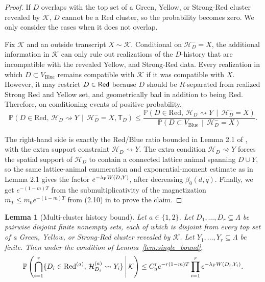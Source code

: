 \documentclass[letterpaper,11pt,reqno]{amsart}
\newtheorem{lemma}[thm]{Lemma}
\theoremstyle{definition}
\newcommand{\Red}{{\sf Red}}
\begin{document}
\begin{proof}
If $D$ overlaps with the top set of a Green, Yellow, or Strong-Red
cluster revealed by \(\mathcal K\), $D$ cannot be a Red cluster, so the probability becomes zero. We only consider the cases when it does not overlap.


Fix \(\mathcal K\) and an outside transcript \(X\sim\mathcal K\). 
Conditional on \(\mathcal H_D^-=X\), the additional information in \(\mathcal K\) can only rule out realizations of the \(D\)-history that are incompatible with the revealed Yellow, and Strong-Red data. 
Every realization in which \(D\subset V_{\mathrm{Blue}}\) remains compatible with \(\mathcal K\) if it was compatible with $X$. 
However, it may restrict $D\in\Red$ because $D$ should be $R$-separated from realized Strong Red and Yellow set, and geometrically bad in addition to being Red. 
Therefore, on conditioning events of positive probability,
\[
\mathbb P\left(
D\in\mathrm{Red},\,\mathcal H_D\rightsquigarrow Y
\,\middle|\,
\mathcal H_D^-=X,\mathsf T_D
\right) 
\le
\frac{
\mathbb P\left(
D\in\mathrm{Red},\,\mathcal H_D\rightsquigarrow Y
\,\middle|\,
\mathcal H_D^-=X
\right)}
{
\mathbb P\left(
D\subset V_{\mathrm{Blue}}
\,\middle|\,
\mathcal H_D^-=X
\right)
}.
\]

The right-hand side is exactly the Red/Blue ratio bounded in Lemma 2.1 of \cite{Exposition}, with the extra support constraint \(\mathcal H_D\rightsquigarrow Y\). The extra condition \(\mathcal H_D\rightsquigarrow Y\) forces the spatial support of \(\mathcal H_D\) to contain a connected lattice animal spanning \(D\cup Y\), so the same lattice-animal enumeration and exponential-moment estimate as in
Lemma 2.1 gives the factor \(e^{-\lambda_{\rm P} W(D,Y)}\), after decreasing \(\beta_0(d,q)\). 
Finally, we get $e^{-(1-m)T}$ from the submultiplicativity of the magnetization  $m_{T}\leq m_0 e^{-(1-m)T}$ from (2.10) in \cite{Exposition} to prove the claim.
\end{proof}

\begin{lemma}[Multi-cluster history bound]
\label{lem:multi-red-bound}
Let \(a\in\{1,2\}\). 
Let \(D_1,\ldots,D_r\subseteq\Lambda\) be pairwise disjoint finite nonempty sets,
each of which is disjoint from every top set of a Green, Yellow, or Strong-Red
cluster revealed by \(\mathcal K\).
Let
\(Y_1,\ldots,Y_r\subseteq\Lambda\) be finite. Then under the condition of Lemma~\ref{lem:single_bound},
\[
\mathbb P\left(
        \bigcap_{i=1}^r
        \{D_i\in{\rm Red}^{(a)},\,
          \mathcal H_{D_i}^{(a)}\rightsquigarrow Y_i\}
        \,\middle|\,\mathcal K
\right)
\le
C_{\rm h}^r e^{-r(1-m)T}
\prod_{i=1}^r e^{-\lambda_{\rm P} W(D_i,Y_i)} .
\]
\end{lemma}
\end{document}
